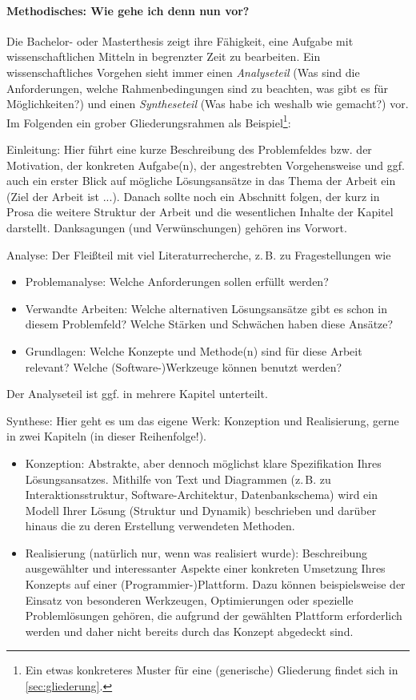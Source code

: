 \documentclass[11pt]{scrartcl}
\newcommand{\qto}[1]{\glqq #1\grqq}				%
\newcommand{\zB}{\mbox{z.\,B.}\xspace}
\newcommand{\ggf}{ggf.\xspace}
\newcommand{\bzw}{bzw.\xspace}
\begin{document}
\paragraph{Methodisches: Wie gehe ich denn nun vor?} Die Bachelor- oder Masterthesis zeigt ihre Fähigkeit, eine Aufgabe mit wissenschaftlichen Mitteln in begrenzter Zeit zu bearbeiten. Ein wissenschaftliches Vorgehen sieht immer einen \textit{Analyseteil} (\qto{Was sind die Anforderungen, welche Rahmenbedingungen sind zu beachten, was gibt es für Möglichkeiten?}) und einen \textit{Syntheseteil} (\qto{Was habe ich weshalb wie gemacht?}) vor. Im Folgenden ein grober Gliederungsrahmen als Beispiel\footnote{Ein etwas konkreteres Muster für eine (generische) Gliederung findet sich in \cref{sec:gliederung}.}:

\begin{gliederung}
	\item Einleitung: Hier führt eine kurze Beschreibung des Problemfeldes \bzw der Motivation, der konkreten Aufgabe(n), der angestrebten Vorgehensweise und \ggf auch ein erster Blick auf mögliche Lösungsansätze in das Thema der Arbeit ein (\qto{Ziel der Arbeit ist ...}). Danach sollte noch ein Abschnitt folgen, der kurz in Prosa die weitere Struktur der Arbeit und die wesentlichen Inhalte der Kapitel darstellt. Danksagungen (und Verwünschungen) gehören ins Vorwort.
	
	\item Analyse: Der \qto{Fleißteil} mit viel Literaturrecherche, \zB zu Fragestellungen wie
	\begin{itemize}
		\item Problemanalyse: Welche Anforderungen sollen erfüllt werden?
		\item Verwandte Arbeiten: Welche alternativen Lösungsansätze gibt es schon in diesem Problemfeld? Welche Stärken und Schwächen haben diese Ansätze?
		\item Grundlagen: Welche Konzepte und Methode(n) sind für diese Arbeit relevant? Welche (Software-)Werkzeuge können benutzt werden?
	\end{itemize}
	Der Analyseteil ist \ggf in mehrere Kapitel unterteilt.

	\item Synthese: Hier geht es um das eigene \qto{Werk}: Konzeption und Realisierung, gerne in zwei Kapiteln (in dieser Reihenfolge!).
	\begin{itemize}
		\item Konzeption: Abstrakte, aber dennoch möglichst klare Spezifikation Ihres Lösungsansatzes. Mithilfe von Text und Diagrammen (\zB zu Interaktionsstruktur, Software-Architektur, Datenbankschema) wird ein Modell Ihrer Lösung (Struktur und Dynamik) beschrieben und darüber hinaus die zu deren Erstellung verwendeten Methoden.
		\item Realisierung (natürlich nur, wenn was realisiert wurde): Beschreibung ausgewählter und interessanter Aspekte einer konkreten Umsetzung Ihres Konzepts auf einer (Programmier-)Plattform. Dazu können beispielsweise der Einsatz von besonderen Werkzeugen, Optimierungen oder spezielle Problemlösungen gehören, die aufgrund der gewählten Plattform erforderlich werden und daher nicht bereits durch das Konzept abgedeckt sind. 


\end{itemize}
\end{gliederung}
\end{document}
